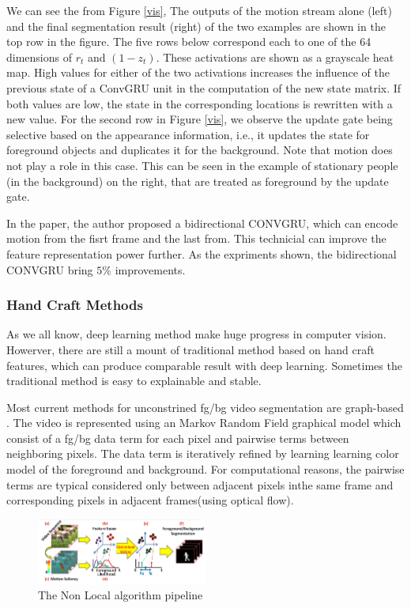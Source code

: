 We can see the from Figure \ref{vis}, The outputs of the motion stream alone (left) and the final segmentation result (right) of the two examples are
shown in the top row in the figure. The five rows below correspond each to one of the 64 dimensions of $r_t$ and $(1− z_t)$.
These activations are shown as a grayscale heat map. 
High values for either of the two activations increases the influence of the previous state of a ConvGRU unit in the computation of the new state matrix. 
If both values are low, the state in the corresponding locations is rewritten with a new value. 
For the second row in Figure \ref{vis}, we observe the update gate being selective based on the appearance information, i.e., it updates the
state for foreground objects and duplicates it for the background. Note that motion does not play a role in this case.
This can be seen in the example of stationary people (in the
background) on the right, that are treated as foreground by
the update gate.

In the paper, the author proposed a bidirectional CONVGRU, which can encode motion from the fisrt frame and the last from. This technicial can improve the feature
representation power further. As the expriments shown, the bidirectional CONVGRU bring $5\%$ improvements.

\subsubsection{Hand Craft Methods}

As we all know, deep learning method make huge progress in computer vision. Howerver, there are still a mount of traditional method based on 
hand craft features, which can produce comparable result with deep learning. Sometimes the traditional method is easy to explainable and stable.

Most current methods for unconstrined fg/bg video segmentation are graph-based \cite{Lee2011Key, Papazoglou2013Fast, zhang2013video}. The video
is represented using an Markov Random Field graphical model which consist of a fg/bg data term for each pixel and pairwise
terms between neighboring pixels. The data term is iteratively refined by learning learning color model of the foreground
and background. For computational reasons, the pairwise  terms are typical considered only between adjacent pixels inthe same 
frame and corresponding pixels in adjacent frames(using optical flow).

\begin{figure}[ht]
    \centering
    \includegraphics[width=0.5\textwidth]{figure/NLC.png}
    \caption{The Non Local algorithm pipeline}
    \label{nlc}
\end{figure}

